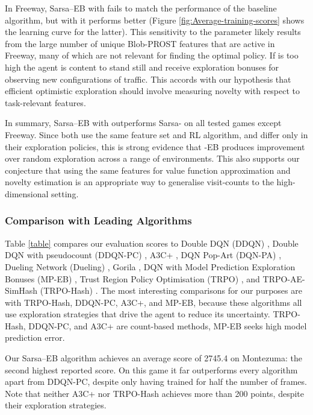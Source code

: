 \documentclass{article}
\theoremstyle{definition}
\theoremstyle{definition}
\theoremstyle{plain}
\theoremstyle{plain}
\theoremstyle{plain}
\begin{document}
In Freeway, Sarsa--EB with  fails to match the
performance of the baseline algorithm, but with  it
performs better (Figure \ref{fig:Average-training-scores} shows the
learning curve for the latter). This sensitivity to the  parameter
likely results from the large number of unique Blob-PROST features
that are active in Freeway, many of which are not relevant for finding
the optimal policy. If  is too high the agent is content to
stand still and receive exploration bonuses for observing new configurations
of traffic. This accords with our hypothesis that efficient optimistic
exploration should involve measuring novelty with respect to task-relevant
features.

In summary, Sarsa--EB with  outperforms Sarsa-
on all tested games except Freeway. Since both use the same feature
set and RL algorithm, and differ only in their exploration policies,
this is strong evidence that -EB produces improvement over
random exploration across a range of environments. This also supports
our conjecture that using the same features for value function approximation
and novelty estimation is an appropriate way to generalise visit-counts
to the high-dimensional setting.


\subsubsection*{Comparison with Leading Algorithms}

Table \ref{table} compares our evaluation scores to Double DQN (DDQN)
\cite{HGS:2016doubleQ}, Double DQN with pseudocount (DDQN-PC) \cite{Bellemare2016},
A3C+ \cite{Bellemare2016}, DQN Pop-Art (DQN-PA) \cite{DBLP:journals/corr/HasseltGHS16},
Dueling Network (Dueling) \cite{WFL:2015DQN}, Gorila \cite{DBLP:journals/corr/NairSBAFMPSBPLM15},
DQN with Model Prediction Exploration Bonuses (MP-EB) \cite{DBLP:journals/corr/StadieLA15},
Trust Region Policy Optimisation (TRPO) \cite{DBLP:journals/corr/SchulmanLMJA15},
and TRPO-AE-SimHash (TRPO-Hash) \cite{Tang2016exploration}. The most
interesting comparisons for our purposes are with TRPO-Hash, DDQN-PC,
A3C+, and MP-EB, because these algorithms all use exploration strategies
that drive the agent to reduce its uncertainty. TRPO-Hash, DDQN-PC,
and A3C+ are count-based methods, MP-EB seeks high model prediction
error.

Our Sarsa--EB algorithm achieves an average score of 2745.4
on Montezuma: the second highest reported score. On this game it far
outperforms every algorithm apart from DDQN-PC, despite only having
trained for half the number of frames. Note that neither A3C+ nor
TRPO-Hash achieves more than 200 points, despite their exploration
strategies. 
\end{document}
